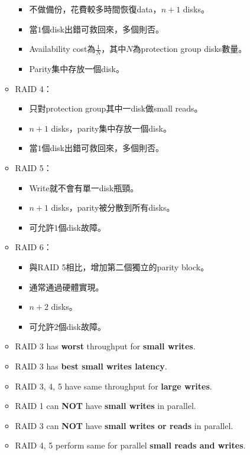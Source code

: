 \begin{itemize}
\begin{itemize}
\begin{itemize}
            \item 不做備份，花費較多時間恢復data，$n + 1$ disks。
            \item 當$1$個disk出錯可救回來，多個則否。
            \item Availability cost為$\frac{1}{N}$，其中$N$為protection group disks數量。
            \item Parity集中存放一個disk。
        \end{itemize}
        \item RAID 4：\begin{itemize}
            \item 只對protection group其中一disk做small reads。
            \item $n + 1$ disks，parity集中存放一個disk。
            \item 當$1$個disk出錯可救回來，多個則否。
        \end{itemize}
        \item RAID 5：\begin{itemize}
            \item Write就不會有單一disk瓶頸。
            \item $n + 1$ disks，parity被分散到所有disks。
            \item 可允許$1$個disk故障。
        \end{itemize}
        \item RAID 6：\begin{itemize}
            \item 與RAID 5相比，增加第二個獨立的parity block。
            \item 通常通過硬體實現。
            \item $n + 2$ disks。
            \item 可允許$2$個disk故障。
        \end{itemize}
        \item RAID 3 has \textbf{worst} throughput for \textbf{small writes}.
        \item RAID 3 has \textbf{best small writes latency}.
        \item RAID 3, 4, 5 have same throughput for \textbf{large writes}.
        \item RAID 1 can \textbf{NOT} have \textbf{small writes} in parallel.
        \item RAID 3 can \textbf{NOT} have \textbf{small writes or reads} in parallel. 
        \item RAID 4, 5 perform same for parallel \textbf{small reads and writes}. 

\end{itemize}
\end{itemize}
